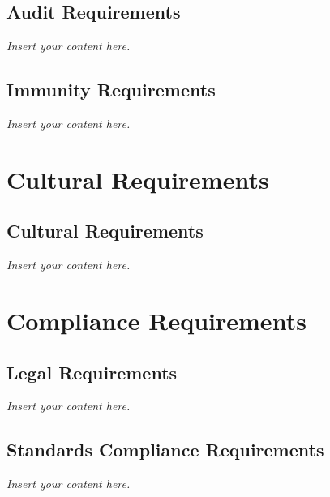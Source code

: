 \documentclass[12pt]{article}
\newcommand{\lips}{\textit{Insert your content here.}}
\begin{document}
\subsection{Audit Requirements}
\lips
\subsection{Immunity Requirements}
\lips

\section{Cultural Requirements}
\subsection{Cultural Requirements}
\lips

\section{Compliance Requirements}
\subsection{Legal Requirements}
\lips
\subsection{Standards Compliance Requirements}
\lips
\end{document}
